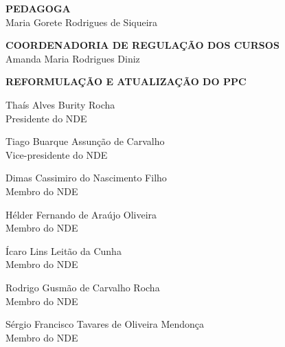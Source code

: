\documentclass[
	12pt,				%
	openright,			%
  oneside,     %
	a4paper,			%
	english,			%
	french,				%
	spanish,			%
	brazil				%
	]{abntex2}
\begin{document}
\begin{center}
  \vspace{16pt}

  \textbf{PEDAGOGA}\\
  Maria Gorete Rodrigues de Siqueira

  \vspace{16pt}

  \textbf{COORDENADORIA DE REGULAÇÃO DOS CURSOS}\\
  Amanda Maria Rodrigues Diniz

  \vspace{16pt}

\newpage

  \textbf{REFORMULAÇÃO E ATUALIZAÇÃO DO PPC}

  \vspace{16pt}

  Thaís Alves Burity Rocha\\
  Presidente do NDE

  \vspace{16pt}

  Tiago Buarque Assunção de Carvalho\\
  Vice-presidente do NDE
  
  \vspace{16pt}

  Dimas Cassimiro do Nascimento Filho\\
  Membro do NDE
  
  \vspace{16pt}

  Hélder Fernando de Araújo Oliveira\\
  Membro do NDE
  
  \vspace{16pt}

  Ícaro Lins Leitão da Cunha\\
  Membro do NDE

  \vspace{16pt}

  Rodrigo Gusmão de Carvalho Rocha\\
  Membro do NDE

  \vspace{16pt}

  Sérgio Francisco Tavares de Oliveira Mendonça\\
  Membro do NDE
\end{center}

\newpage


\end{document}
